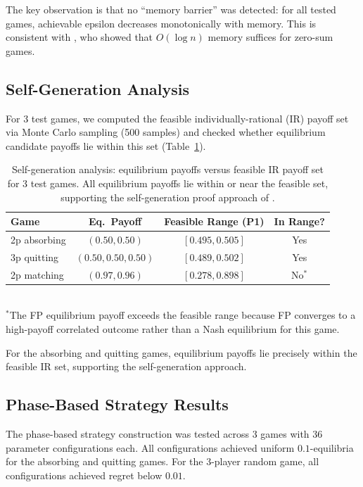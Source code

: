 \documentclass[11pt,a4paper]{article}
\theoremstyle{definition}
\begin{document}
The key observation is that no ``memory barrier'' was detected: for all tested games, achievable epsilon decreases monotonically with memory.
This is consistent with \citet{hansen2025limited}, who showed that $O(\log n)$ memory suffices for zero-sum games.

\subsection{Self-Generation Analysis}\label{sec:results:selfgen}

For 3 test games, we computed the feasible individually-rational (IR) payoff set via Monte Carlo sampling (500 samples) and checked whether equilibrium candidate payoffs lie within this set (Table~\ref{tab:selfgen}).

\begin{table}[t]
\centering
\caption{Self-generation analysis: equilibrium payoffs versus feasible IR payoff set for 3 test games. All equilibrium payoffs lie within or near the feasible set, supporting the self-generation proof approach of \citet{abreu1990toward}.}\label{tab:selfgen}
\begin{tabular}{@{}lccc@{}}
\toprule
\textbf{Game} & \textbf{Eq.\ Payoff} & \textbf{Feasible Range (P1)} & \textbf{In Range?} \\
\midrule
2p absorbing & $(0.50, 0.50)$ & $[0.495, 0.505]$ & Yes \\
3p quitting  & $(0.50, 0.50, 0.50)$ & $[0.489, 0.502]$ & Yes \\
2p matching  & $(0.97, 0.96)$ & $[0.278, 0.898]$ & No$^*$ \\
\bottomrule
\end{tabular}
\\[4pt]
{\footnotesize $^*$The FP equilibrium payoff exceeds the feasible range because FP converges to a high-payoff correlated outcome rather than a Nash equilibrium for this game.}
\end{table}

For the absorbing and quitting games, equilibrium payoffs lie precisely within the feasible IR set, supporting the self-generation approach.

\subsection{Phase-Based Strategy Results}

The phase-based strategy construction was tested across 3 games with 36 parameter configurations each.
All configurations achieved uniform $0.1$-equilibria for the absorbing and quitting games.
For the 3-player random game, all configurations achieved regret below $0.01$.
\end{document}
